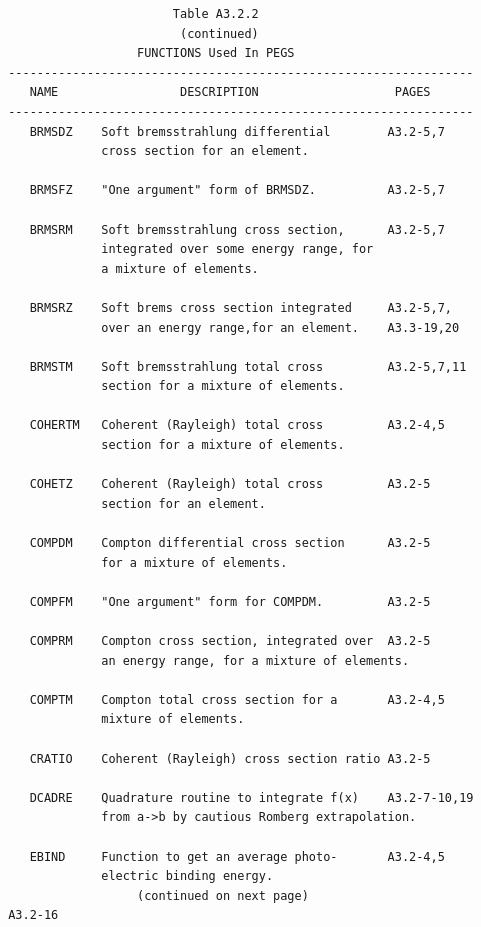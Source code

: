 \newpage  {}\begin{verbatim}
                        Table A3.2.2
                         (continued)
                   FUNCTIONS Used In PEGS
 -----------------------------------------------------------------
    NAME                 DESCRIPTION                   PAGES
 -----------------------------------------------------------------
    BRMSDZ    Soft bremsstrahlung differential        A3.2-5,7
              cross section for an element.

    BRMSFZ    "One argument" form of BRMSDZ.          A3.2-5,7

    BRMSRM    Soft bremsstrahlung cross section,      A3.2-5,7
              integrated over some energy range, for
              a mixture of elements.

    BRMSRZ    Soft brems cross section integrated     A3.2-5,7,
              over an energy range,for an element.    A3.3-19,20

    BRMSTM    Soft bremsstrahlung total cross         A3.2-5,7,11
              section for a mixture of elements.

    COHERTM   Coherent (Rayleigh) total cross         A3.2-4,5
              section for a mixture of elements.

    COHETZ    Coherent (Rayleigh) total cross         A3.2-5
              section for an element.

    COMPDM    Compton differential cross section      A3.2-5
              for a mixture of elements.

    COMPFM    "One argument" form for COMPDM.         A3.2-5

    COMPRM    Compton cross section, integrated over  A3.2-5
              an energy range, for a mixture of elements.

    COMPTM    Compton total cross section for a       A3.2-4,5
              mixture of elements.

    CRATIO    Coherent (Rayleigh) cross section ratio A3.2-5

    DCADRE    Quadrature routine to integrate f(x)    A3.2-7-10,19
              from a->b by cautious Romberg extrapolation.

    EBIND     Function to get an average photo-       A3.2-4,5
              electric binding energy.
                   (continued on next page)
 A3.2-16
\end{verbatim}
